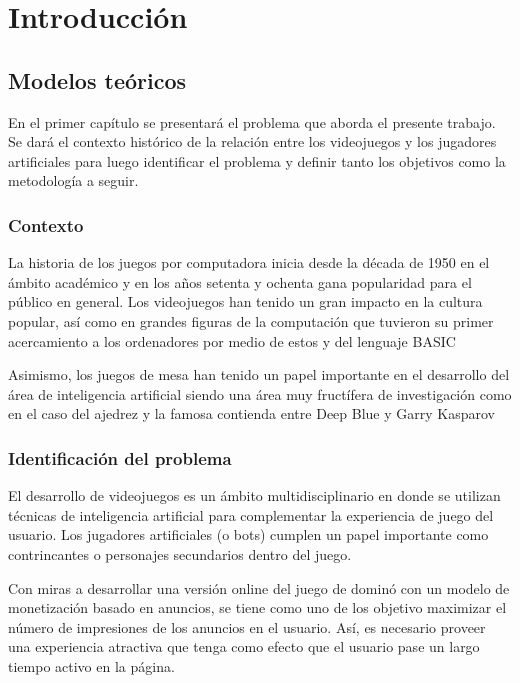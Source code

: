 \chapter*{Introducción}

\section{Modelos teóricos}

\noindent 

En el primer capítulo se presentará el problema que aborda el presente trabajo. Se dará el 
contexto histórico de la relación entre los videojuegos y los jugadores artificiales para luego 
identificar el problema y definir tanto los objetivos como la metodología a seguir.

\subsection{Contexto}

La historia de los juegos por computadora inicia desde la década de 1950 en el ámbito 
académico y en los años setenta y ochenta gana popularidad para el público en general. Los 
videojuegos han tenido un gran impacto en la cultura popular, así como en grandes figuras 
de la computación que tuvieron su primer acercamiento a los ordenadores por medio de 
estos y del lenguaje BASIC

Asimismo, los juegos de mesa han tenido un papel importante en el desarrollo del área de 
inteligencia artificial siendo una área muy fructífera de investigación como en el caso del 
ajedrez y la famosa contienda entre Deep Blue y Garry Kasparov

\subsection{Identificación del problema}

 El desarrollo de videojuegos es un ámbito multidisciplinario en donde se utilizan técnicas 
de inteligencia artificial para complementar la experiencia de juego del usuario. Los 
jugadores artificiales (o bots) cumplen un papel importante como contrincantes o 
personajes secundarios dentro del juego. 

Con miras a desarrollar una versión online del juego de dominó con un modelo de 
monetización basado en anuncios, se tiene como uno de los objetivo maximizar el número 
de impresiones de los anuncios en el usuario. Así, es necesario proveer una experiencia 
atractiva que tenga como efecto que el usuario pase un largo tiempo activo en la página.

